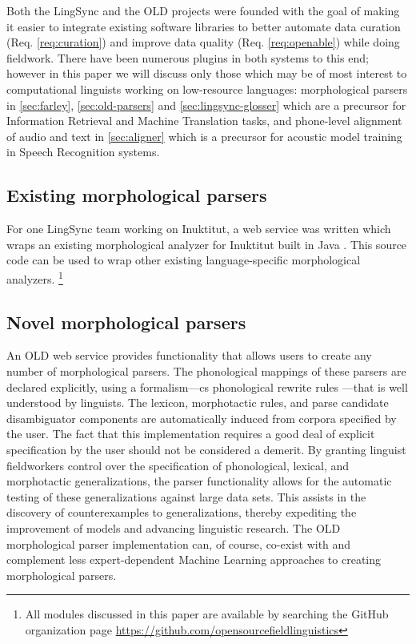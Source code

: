 \documentclass[11pt]{article}
\begin{document}
Both the LingSync and the OLD projects were founded with the goal of making it
easier to integrate existing software
libraries to better automate data curation (Req. \autoref{req:curation}) and 
improve data quality (Req. \autoref{req:openable}) while doing fieldwork. There have been numerous
plugins in both systems to this end; however in this paper we will discuss only
those which may be of most interest to computational linguists working on
low-resource languages: morphological parsers in \autoref{sec:farley}, 
\autoref{sec:old-parsers} and \autoref{sec:lingsync-glosser} which are a
precursor for Information Retrieval and Machine Translation tasks, and 
phone-level alignment of audio and text in \autoref{sec:aligner} which is a
precursor for acoustic model training in Speech Recognition systems.



\subsection{Existing morphological parsers}
\label{sec:farley}

For one LingSync team working on Inuktitut, a web service was written which
wraps an existing morphological analyzer for Inuktitut built in Java
\cite{Farley:2012:Online}. This source code can be used to wrap other existing
language-specific morphological analyzers.%
\footnote{All modules discussed in this paper are available by searching the
    GitHub organization page
\url{https://github.com/opensourcefieldlinguistics}}


\subsection{Novel morphological parsers}
\label{sec:old-parsers}

An OLD web service provides functionality that allows users to create any
number of morphological parsers. The phonological mappings of these parsers
are declared explicitly, using a formalism---\gls{cs} phonological rewrite
rules \cite{chomsky68}---that is well understood by linguists. The lexicon,
morphotactic rules, and parse candidate disambiguator components are
automatically induced from corpora specified by the user. The fact that this
implementation requires a good deal of explicit specification by the user
should not be considered a demerit. By granting linguist fieldworkers control
over the specification of phonological, lexical, and morphotactic
generalizations, the parser functionality allows for the automatic testing of
these generalizations against large data sets. This assists in the discovery of
counterexamples to generalizations, thereby expediting the improvement of
models and advancing linguistic research. The OLD morphological parser
implementation can, of course, co-exist with and complement less
expert-dependent Machine Learning approaches to creating morphological parsers.
\end{document}
